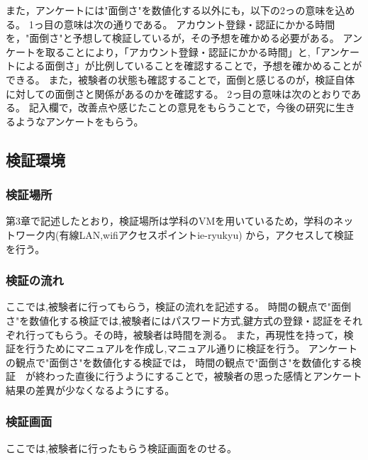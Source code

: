 また，アンケートには"面倒さ"を数値化する以外にも，以下の2っの意味を込める。
1っ目の意味は次の通りである。
アカウント登録・認証にかかる時間 を，"面倒さ"と予想して検証しているが，その予想を確かめる必要がある。
アンケートを取ることにより，「アカウント登録・認証にかかる時間」と,「アンケートによる面倒さ」が比例していることを確認することで，予想を確かめることができる。
また，被験者の状態も確認することで，面倒と感じるのが，検証自体に対しての面倒さと関係があるのかを確認する。
2っ目の意味は次のとおりである。
記入欄で，改善点や感じたことの意見をもらうことで，今後の研究に生きるようなアンケートをもらう。








\subsection{検証環境}
 \subsubsection{検証場所}
 第3章で記述したとおり，検証場所は学科のVMを用いているため，学科のネットワーク内(有線LAN,wifiアクセスポイント{ie-ryukyu})
 から，アクセスして検証を行う。



 \subsubsection{検証の流れ}
    ここでは,被験者に行ってもらう，検証の流れを記述する。
    時間の観点で"面倒さ"を数値化する検証では,被験者にはパスワード方式,鍵方式の登録・認証をそれぞれ行ってもらう。その時，被験者は時間を測る。 
    また，再現性を持って，検証を行うためにマニュアルを作成し,マニュアル通りに検証を行う。
    アンケートの観点で"面倒さ"を数値化する検証では，
    時間の観点で"面倒さ"を数値化する検証　が終わった直後に行うようにすることで，被験者の思った感情とアンケート結果の差異が少なくなるようにする。
  

  \subsubsection{検証画面}
    ここでは,被験者に行ったもらう検証画面をのせる。

